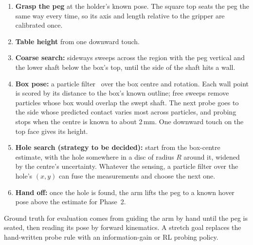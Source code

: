 \documentclass[conference]{IEEEtran}
\begin{document}
\begin{enumerate}
  \item \textbf{Grasp the peg} at the holder's known pose. The square top seats
  the peg the same way every time, so its axis and length relative to the
  gripper are calibrated once.
  \item \textbf{Table height} from one downward touch.
  \item \textbf{Coarse search:} sideways sweeps across the region with the peg
  vertical and the lower shaft below the box's top, until the side of the
  shaft hits a wall.
  \item \textbf{Box pose:} a particle filter~\cite{thrun2005probabilistic} over
  the box centre and rotation. Each wall point is scored by its distance to the
  box's known outline; free sweeps remove particles whose box would overlap the
  swept shaft. The next probe goes to the side whose predicted contact varies
  most across particles, and probing stops when the centre is known to about
  2\,mm. One downward touch on the top face gives its height.
  \item \textbf{Hole search (strategy to be decided):} start from the box-centre
  estimate, with the hole somewhere in a disc of radius $R$ around it, widened by
  the centre's uncertainty. Whatever the sensing, a particle filter over the
  hole's $(x,y)$ can fuse the measurements and choose the next one.
  \item \textbf{Hand off:} once the hole is found, the arm lifts the peg to a
  known hover pose above the estimate for Phase~2.
\end{enumerate}

Ground truth for evaluation comes from guiding the arm by hand until the peg is
seated, then reading its pose by forward kinematics. A stretch goal replaces the
hand-written probe rule with an information-gain or RL probing policy.
\end{document}

